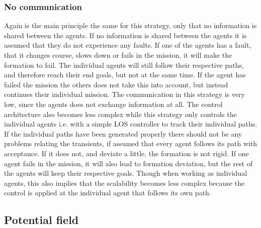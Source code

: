 \subsubsection{No communication}
Again is the main principle the same for this strategy, only that no information is shared between the agents. If no information is shared between the agents it is assumed that they do not experience any faults. If one of the agents has a fault, that it changes course, slows down or fails in the mission, it will make the formation to fail. The individual agents will still follow their respective paths, and therefore reach their end goals, but not at the same time. If the agent has failed the mission the others does not take this into account, but instead continues their individual mission. The communication in this strategy is very low, since the agents does not exchange information at all. The control architecture also becomes less complex while this strategy only controls the individual agents i.e. with a simple \ac{LOS} controller to track their individual paths. If the individual paths have been generated properly there should not be any problems relating the transients, if assumed that every agent follows its path with acceptance. If it does not, and deviate a little, the formation is not rigid. If one agent fails in the mission, it will also lead to formation deviation, but the rest of the agents will keep their respective goals. Though when working as individual agents, this also implies that the scalability becomes less complex because the control is applied at the individual agent that follows its own path.

\subsection{Potential field}
